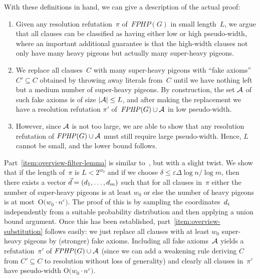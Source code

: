 \documentclass{theoretics}
\newcommand{\Bigoh}[1]{\mathrm{O} \bigl( #1 \bigr)}
\newcommand{\setsize}[1]{\lvert#1\rvert}
\newcommand{\union}{\cup}
\newcommand{\wolog}{without loss of generality\xspace}
\newcommand{\proofpi}{\pi}
\newcommand{\clc}{\ensuremath{C}}
\newcommand{\lengthstd}{L}
\newcommand{\formulaformat}[1]{\mathit{#1}}
\newcommand{\graphfphpnot}[1][G]{\formulaformat{FPHP}({#1})}
\newcommand{\fakeaxiomintro}{fake axiom\xspace}
\newcommand{\heavy}{heavy\xspace}
\newcommand{\sheavy}{super-heavy\xspace}
\newcommand{\superheavy}{\sheavy}
\newcommand{\GFPHP}{G\text{-}FPHP}
\renewcommand{\GFPHP}{\graphfphpnot[G]}
\newcommand{\GdegMax}{\Delta}
\newcommand{\gdegmax}{\GdegMax}
\newcommand{\Ax}{\ensuremath\mathcal{A}}
\newcommand{\thr}[1]{ \ensuremath d_{{#1}} }
\newcommand{\vecthr}{\vec{d}}
\newcommand{\pseudowidth}{pseudo-width\xspace}
\numberwithin{equation}{section}
\begin{document}
With these definitions in hand, we can give a description of the
actual proof:
\begin{enumerate}
\item 
\label{item:overview-filter-lemma}
  Given any resolution refutation~$\proofpi$ of~$\GFPHP$ in small
  length~$\lengthstd$, we argue that all clauses can be classified as
  having either low or high \pseudowidth, where 
  an important additional guarantee is that 
  the high-width clauses not
  only have many \heavy pigeons but actually many \superheavy pigeons.
  
\item
  \label{item:overview-substitution}
  We replace all clauses~$\clc$ with many \superheavy pigeons with
  ``\fakeaxiomintro{}s''
  $\clc' \subseteq \clc$
  obtained by throwing away literals from~$\clc$
  until we have nothing left but a medium number of \superheavy pigeons.
  By construction, the set $\Ax$ of such \fakeaxiomintro{}s is of size
  $\setsize{\Ax} \leq \lengthstd$, and after making the replacement we
  have a resolution refutation $\proofpi'$ of~$\GFPHP \union \Ax$
  in low \pseudowidth.
  
\item
\label{item:overview-pseudowidth-lower-bound}
  However, since  $\Ax$ is not too large, we are able to show that
  any resolution refutation of
  $\GFPHP \union \Ax$
  must still require   large pseudo-width. Hence, $\lengthstd$ cannot
  be small, and the lower bound follows.
\end{enumerate}


Part~\ref{item:overview-filter-lemma}
is similar to~\cite{Razborov03ResolutionLowerBoundsWFPHP},
but with a slight twist.
We show that if the length of~$\proofpi$ is  $\lengthstd < 2^{w_0}$
and if we choose
$
\delta \leq 
\varepsilon
\gdegmax \log n / \log m
$, 
then there exists  a vector
$\vecthr = (\thr{1}, \ldots, \thr{m})$
such that for all clauses 
in~$\proofpi$  either the number of \superheavy pigeons is
at least $w_0$
or else the number of \heavy pigeons is at 
\mbox{most
$
\Bigoh{w_0 \cdot n^{\varepsilon}}        
$.}
The proof of this is by sampling the coordinates~$\thr{i}$
independently from a suitable probability distribution and then
applying a union bound argument.
Once this has been established,
part~\ref{item:overview-substitution}
follows easily:
we just replace all clauses with at least
$w_0$ \superheavy pigeons by  
(stronger) \fakeaxiomintro{}s.
Including all \fakeaxiomintro{}s~$\Ax$ yields a
refutation~$\proofpi'$ of
$ \GFPHP \union \Ax $ (since we can add a weakening rule
deriving
$\clc$ from   $\clc' \subseteq \clc$
to resolution \wolog)
and clearly all clauses 
in~$\proofpi'$
have \pseudowidth
$\Bigoh{w_0 \cdot n^\varepsilon}$.
\end{document}
